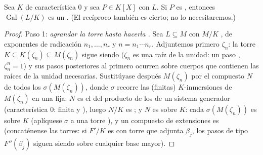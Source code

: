\begin{theorem}[Galois]\label{thm:b3:galois:solvable}
Sea $K$ de característica $0$ y sea $P \in K[X]$ con
 $L$. Si $P$
es , entonces
$\operatorname{Gal}(L/K)$ es un . (El recíproco también es cierto; no lo
necesitaremos.)
\end{theorem}

\begin{proof}
Paso 1: \emph{agrandar la torre 
hasta hacerla .} Sea $L
\subseteq M$ con $M/K$ , de
exponentes de radicación $n_1, \dots,
n_r$ y $n = n_1\cdots n_r$. Adjuntemos primero $\zeta_n$: la torre
$K \subseteq K(\zeta_n) \subseteq M(\zeta_n)$ sigue siendo
 ($\zeta_n$ es una raíz de la
unidad: un paso ,
$\zeta_n^n = 1$) y sus pasos posteriores al primero ocurren sobre
cuerpos que contienen las raíces de la unidad necesarias. Sustitúyase
después $M(\zeta_n)$ por el compuesto $N$ de todos los
$\sigma(M(\zeta_n))$, donde $\sigma$ recorre las (finitas)
$K$-inmersiones de $M(\zeta_n)$ en una
 fija: $N$ es el
 del producto
de los  de un
sistema generador (característica $0$: finita y
), luego $N/K$ es
; y $N$ es
 sobre $K$: cada
$\sigma(M(\zeta_n))$ es  sobre
$K$ (aplíquese $\sigma$ a una torre
), y un compuesto de extensiones
 es
 (concaténense las torres: si
$F'/K$ es  con torre que adjunta
$\beta_j$, los pasos de tipo $F''(\beta_j)$ siguen siendo
 sobre cualquier base mayor).


\end{proof}
